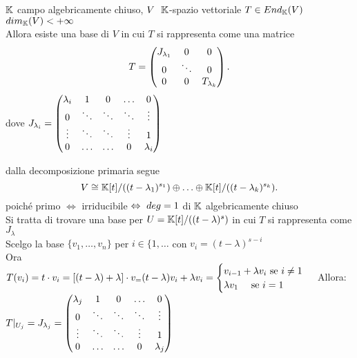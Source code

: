 \documentclass[12px]{article}
\begin{document}
\begin{teo}
	$\mathbb{K}$ campo algebricamente chiuso, $V\ \ \mathbb{K}$-spazio vettoriale  $T\in End_{\mathbb{K}}(V)$ \  $dim_{\mathbb{K}}(V) < +\infty$\\
	Allora esiste una base di  $V$ in cui $T$ si rappresenta come una matrice
	\[
		T =\begin{pmatrix}J_{\lambda_1} & 0 & 0\\
			0 & \ddots & 0\\
			0 & 0 & T_{\lambda_k}\end{pmatrix}
	.\] 
			dove $J_{\lambda_i} = \begin{pmatrix}\lambda_i & 1 & 0 &\ldots & 0 \\
				0 & \ddots & \ddots & \ddots &\vdots\\
				\vdots & \ddots & \ddots & \vdots & 1\\
			0 & \ldots & \ldots & 0 & \lambda_i\end{pmatrix}
				$
\end{teo}
\begin{dimo}
	dalla decomposizione primaria segue
	\[
		V\cong \mathbb{K}[t]/((t-\lambda_1)^{s_1})\oplus\ldots\oplus\mathbb{K}[t]/((t-\lambda_k)^{s_k})
	.\] 
	poiché primo $ \Leftrightarrow$ irriducibile $ \Leftrightarrow\ deg =1 \hfill $ di $\mathbb{K}$ algebricamente chiuso \\
	Si tratta  di trovare una base per $U = \mathbb{K}[t]/((t-\lambda)^{s})$ in cui $T$ si rappresenta come $J_\lambda$ \\
	Scelgo la base $\{v_1,\ldots,v_n\}$ per $i\in\{1,\ldots $ con  $v_i = (t-\lambda)^{s-i}$\\
		Ora \\
		$T(v_i) = t\cdot v_i = [(t-\lambda) + \lambda] \cdot v_ = (t- \lambda)v_i + \lambda v_i\\
		= \begin{cases}
			v_{i - 1} + \lambda v_i \text{ se } i\neq 1\\
			\lambda v_1 \ \ \ \text{ se } i = 1
		\end{cases}$
		Allora:\\
		$T|_{U_j} = J_{\lambda_j} = \begin{pmatrix}\lambda_j & 1 & 0 &\ldots & 0 \\
				0 & \ddots & \ddots & \ddots &\vdots\\
				\vdots & \ddots & \ddots & \vdots & 1\\
			0 & \ldots & \ldots & 0 & \lambda_j\end{pmatrix}
				$
\end{dimo}
\end{document}
